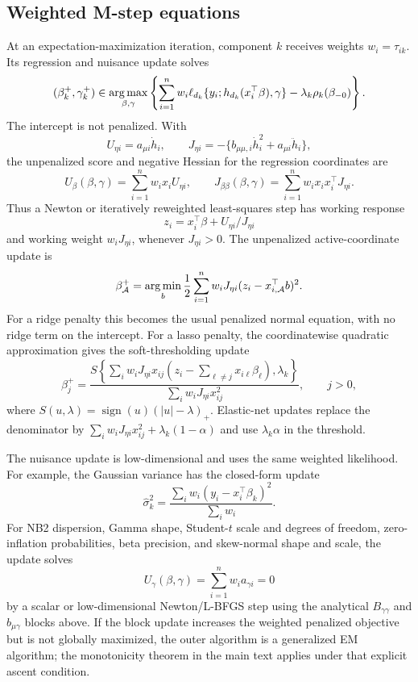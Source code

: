 \subsection{Weighted M-step equations}
\label{app:mstep}

At an expectation-maximization iteration, component \(k\) receives weights
\(w_i=\tau_{ik}\).  Its regression and nuisance update solves
\[
    (\beta_k^{+},\gamma_k^{+})
    \in
    \operatorname*{arg\,max}_{\beta,\gamma}
    \left\{
    \sum_{i=1}^n w_i
    \ell_{d_k}\{y_i;h_{d_k}(x_i^\top\beta),\gamma\}
    -
    \lambda_k\rho_k(\beta_{-0})
    \right\}.
\]
The intercept is not penalized.  With
\[
    U_{\eta i}=a_{\mu i}\dot h_i,\qquad
    J_{\eta i}=-
    \{b_{\mu\mu,i}\dot h_i^2+a_{\mu i}\ddot h_i\},
\]
the unpenalized score and negative Hessian for the regression coordinates are
\[
    U_\beta(\beta,\gamma)=\sum_{i=1}^n w_i x_i U_{\eta i},
    \qquad
    J_{\beta\beta}(\beta,\gamma)=
    \sum_{i=1}^n w_i x_ix_i^\top J_{\eta i}.
\]
Thus a Newton or iteratively reweighted least-squares step has working
response
\[
    z_i=x_i^\top\beta+U_{\eta i}/J_{\eta i}
\]
and working weight \(w_iJ_{\eta i}\), whenever \(J_{\eta i}>0\).  The
unpenalized active-coordinate update is
\[
    \beta_{\mathcal A}^{+}
    =
    \operatorname*{arg\,min}_b
    \frac12
    \sum_{i=1}^n w_iJ_{\eta i}
    (z_i-x_{i,\mathcal A}^\top b)^2.
\]
For a ridge penalty this becomes the usual penalized normal equation, with no
ridge term on the intercept.  For a lasso penalty, the coordinatewise quadratic
approximation gives the soft-thresholding update
\[
    \beta_j^{+}
    =
    \frac{
    S\left\{
    \sum_i w_iJ_{\eta i}x_{ij}
    \left(z_i-\sum_{\ell\neq j}x_{i\ell}\beta_\ell\right),
    \lambda_k
    \right\}}
    {\sum_i w_iJ_{\eta i}x_{ij}^2},
    \qquad j>0,
\]
where \(S(u,\lambda)=\operatorname{sign}(u)(|u|-\lambda)_+\).  Elastic-net
updates replace the denominator by
\(\sum_i w_iJ_{\eta i}x_{ij}^2+\lambda_k(1-\alpha)\) and use
\(\lambda_k\alpha\) in the threshold.

The nuisance update is low-dimensional and uses the same weighted likelihood.
For example, the Gaussian variance has the closed-form update
\[
    \hat\sigma_k^2
    =
    \frac{\sum_i w_i(y_i-x_i^\top\beta_k)^2}{\sum_i w_i}.
\]
For NB2 dispersion, Gamma shape, Student-\(t\) scale and degrees of freedom,
zero-inflation probabilities, beta precision, and skew-normal shape and scale,
the update solves
\[
    U_\gamma(\beta,\gamma)=
    \sum_{i=1}^n w_i a_{\gamma i}=0
\]
by a scalar or low-dimensional Newton/L-BFGS step using the analytical
\(B_{\gamma\gamma}\) and \(b_{\mu\gamma}\) blocks above.  If the block update
increases the weighted penalized objective but is not globally maximized, the
outer algorithm is a generalized EM algorithm; the monotonicity theorem in the
main text applies under that explicit ascent condition.
